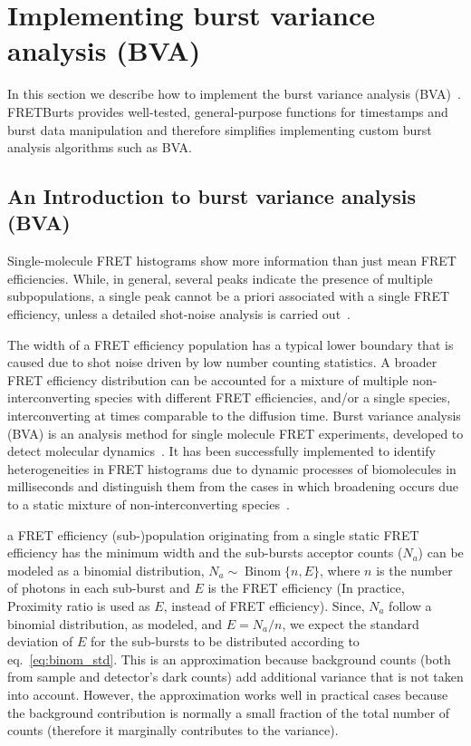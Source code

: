 \section{Implementing burst variance analysis (BVA)}


\label{sec:bva}
In this section we describe how to implement the burst variance analysis (BVA)~\cite{Torella_2011}.
FRETBurts provides well-tested, general-purpose functions for timestamps and burst data 
manipulation and therefore simplifies implementing custom burst analysis algorithms such as BVA.

\subsection{An Introduction to burst variance analysis (BVA)}
Single-molecule FRET histograms show more information than just mean FRET efficiencies. 
While, in general, several peaks indicate the presence of multiple subpopulations, 
a single peak cannot be a priori associated with a single FRET efficiency,
unless a detailed shot-noise analysis is carried out~\cite{Nir_2006,Antonik2006}.

The width of a FRET efficiency population has a typical lower boundary that is caused due to shot noise driven by low number counting statistics. A broader FRET efficiency distribution can be accounted for a mixture of multiple non-interconverting species with different FRET efficiencies, and/or a single species, interconverting at times comparable to the diffusion time. Burst variance analysis (BVA) is an analysis method for single molecule FRET experiments, developed to detect molecular dynamics~\cite{Torella_2011}. It has been successfully implemented to identify heterogeneities in FRET histograms due to dynamic processes of biomolecules in milliseconds and distinguish them from the cases in which broadening occurs due to a static mixture of non-interconverting species~\cite{Torella_2011, Robb_2013}.

a FRET efficiency (sub-)population originating from a single static FRET efficiency has the minimum width and the sub-bursts acceptor counts ($N_a$) can be modeled as a binomial distribution, 
$N_a \sim \operatorname{Binom} \{n, E\}$, where $n$ is the number of photons in each sub-burst and 
$E$ is the FRET efficiency (In practice, Proximity ratio is used as $E$, instead of FRET efficiency). Since, $N_a$ follow a binomial distribution, as modeled, and $E = N_a/n$, we expect the standard deviation of $E$ for the sub-bursts to be distributed according to eq.~\ref{eq:binom_std}. 
This is an approximation because background counts (both from sample and detector's dark counts) add additional variance that is not taken into account. However, the approximation works well in practical cases because the background contribution
is normally a small fraction of the total number of counts (therefore it marginally contributes to the variance).

